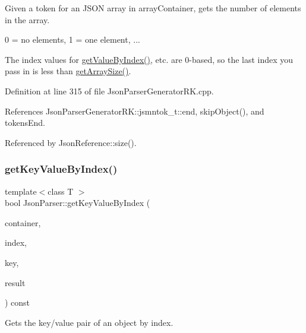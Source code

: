 Given a token for an J\+S\+ON array in array\+Container, gets the number of elements in the array. 

0 = no elements, 1 = one element, ...

The index values for \hyperlink{class_json_parser_a53bd8a6ebb0d9b246b876653e792368f}{get\+Value\+By\+Index()}, etc. are 0-\/based, so the last index you pass in is less than \hyperlink{class_json_parser_aeb46af21c13fa2396e065543bd8db265}{get\+Array\+Size()}. 

Definition at line 315 of file Json\+Parser\+Generator\+R\+K.\+cpp.



References Json\+Parser\+Generator\+R\+K\+::jsmntok\+\_\+t\+::end, skip\+Object(), and tokens\+End.



Referenced by Json\+Reference\+::size().

\mbox{\label{class_json_parser_a5759f53499dcb4418e07e9c5e1a42442}} 
\subsubsection{\texorpdfstring{get\+Key\+Value\+By\+Index()}{getKeyValueByIndex()}}
{\footnotesize\ttfamily template$<$class T $>$ \\
bool Json\+Parser\+::get\+Key\+Value\+By\+Index (\begin{DoxyParamCaption}\item[{const \hyperlink{struct_json_parser_generator_r_k_1_1jsmntok__t}{Json\+Parser\+Generator\+R\+K\+::jsmntok\+\_\+t} $\ast$}]{container,  }\item[{size\+\_\+t}]{index,  }\item[{\hyperlink{class_string}{String} \&}]{key,  }\item[{T \&}]{result }\end{DoxyParamCaption}) const\hspace{0.3cm}{\ttfamily [inline]}}



Gets the key/value pair of an object by index. 



